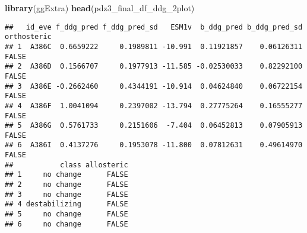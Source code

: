 \documentclass[
]{article}
\newenvironment{Shaded}{\begin{snugshade}}{\end{snugshade}}
\newcommand{\AttributeTok}[1]{\textcolor[rgb]{0.13,0.29,0.53}{#1}}
\newcommand{\CommentTok}[1]{\textcolor[rgb]{0.56,0.35,0.01}{\textit{#1}}}
\newcommand{\DecValTok}[1]{\textcolor[rgb]{0.00,0.00,0.81}{#1}}
\newcommand{\FunctionTok}[1]{\textcolor[rgb]{0.13,0.29,0.53}{\textbf{#1}}}
\newcommand{\NormalTok}[1]{#1}
\newcommand{\OtherTok}[1]{\textcolor[rgb]{0.56,0.35,0.01}{#1}}
\newcommand{\SpecialCharTok}[1]{\textcolor[rgb]{0.81,0.36,0.00}{\textbf{#1}}}
\newcommand{\StringTok}[1]{\textcolor[rgb]{0.31,0.60,0.02}{#1}}
\begin{document}
\begin{Shaded}
\end{Shaded}

\begin{Shaded}
\begin{Highlighting}[]
\FunctionTok{library}\NormalTok{(ggExtra)}
\FunctionTok{head}\NormalTok{(pdz3\_final\_df\_ddg\_2plot)}
\end{Highlighting}
\end{Shaded}

\begin{verbatim}
##   id_eve f_ddg_pred f_ddg_pred_sd   ESM1v  b_ddg_pred b_ddg_pred_sd orthosteric
## 1  A386C  0.6659222     0.1989811 -10.991  0.11921857    0.06126311       FALSE
## 2  A386D  0.1566707     0.1977913 -11.585 -0.02530033    0.82292100       FALSE
## 3  A386E -0.2662460     0.4344191 -10.914  0.04624840    0.06722154       FALSE
## 4  A386F  1.0041094     0.2397002 -13.794  0.27775264    0.16555277       FALSE
## 5  A386G  0.5761733     0.2151606  -7.404  0.06452813    0.07905913       FALSE
## 6  A386I  0.4137276     0.1953078 -11.800  0.07812631    0.49614970       FALSE
##           class allosteric
## 1     no change      FALSE
## 2     no change      FALSE
## 3     no change      FALSE
## 4 destabilizing      FALSE
## 5     no change      FALSE
## 6     no change      FALSE
\end{verbatim}
\end{document}
